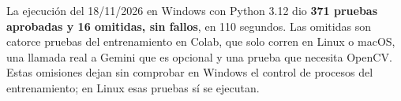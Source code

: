 La ejecución del 18/11/2026 en Windows con Python 3.12 dio \textbf{371 pruebas aprobadas y 16 omitidas, sin fallos}, en 110 segundos. Las omitidas son catorce pruebas del entrenamiento en Colab, que solo corren en Linux o macOS, una llamada real a Gemini que es opcional y una prueba que necesita OpenCV. Estas omisiones dejan sin comprobar en Windows el control de procesos del entrenamiento; en Linux esas pruebas sí se ejecutan.
